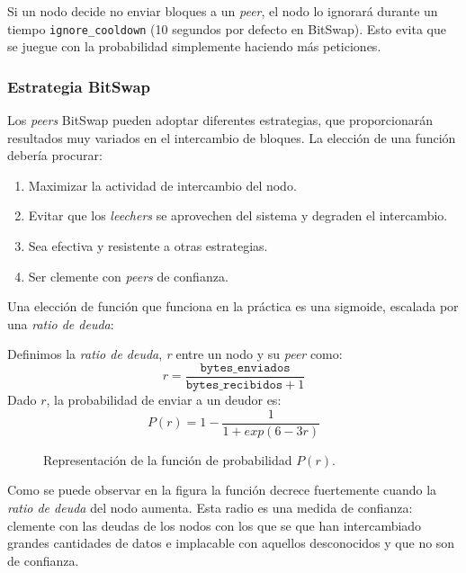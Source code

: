 \documentclass[12pt]{article} %
\begin{document}
Si un nodo decide no enviar bloques a un \textit{peer}, el nodo lo ignorará durante un tiempo \texttt{ignore\_cooldown} (10 segundos por defecto en BitSwap). Esto evita que se juegue con la probabilidad simplemente haciendo más peticiones.


\subsubsection{Estrategia BitSwap} %
\label{ssub:estrategia_bitswap}

Los \textit{peers} BitSwap pueden adoptar diferentes estrategias, que proporcionarán resultados muy variados en el intercambio de bloques. La elección de una función debería procurar:
\begin{enumerate}
	\item Maximizar la actividad de intercambio del nodo.
	\item Evitar que los \textit{leechers} se aprovechen del sistema y degraden el intercambio.
	\item Sea efectiva y resistente a otras estrategias.
	\item Ser clemente con \textit{peers} de confianza.
\end{enumerate}
Una elección de función que funciona en la práctica es una sigmoide, escalada por una \textit{ratio de deuda}:

Definimos la \textit{ratio de deuda}, \textit{r} entre un nodo y su \textit{peer} como:
\begin{equation*}
	r = \frac{\texttt{bytes\_enviados}}{\texttt{bytes\_recibidos} + 1}
\end{equation*}
Dado $r$, la probabilidad de enviar a un deudor es:
\begin{equation*}
	P(r) = 1 - \frac{1}{1 + exp(6-3r)}
\end{equation*}

\begin{figure}
	\centering
	\caption{Representación de la función de probabilidad $P(r)$.}
\end{figure}

Como se puede observar en la figura la función decrece fuertemente cuando la \textit{ratio de deuda} del nodo aumenta. Esta radio es una medida de confianza: clemente con las deudas de los nodos con los que se que han intercambiado grandes cantidades de datos e implacable con  aquellos desconocidos y que no son de confianza.
\end{document}

